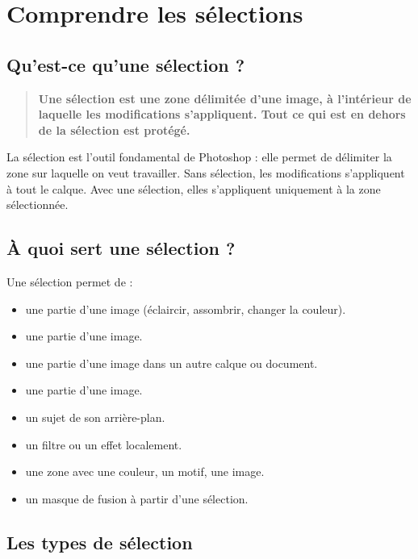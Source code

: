 \section{Comprendre les sélections}

\subsection{Qu'est-ce qu'une sélection ?}

\begin{quote}
\textbf{Une sélection est une zone délimitée d'une image, à l'intérieur de laquelle les modifications s'appliquent. Tout ce qui est en dehors de la sélection est protégé.}
\end{quote}

La sélection est l'outil fondamental de Photoshop : elle permet de délimiter la zone sur laquelle on veut travailler. Sans sélection, les modifications s'appliquent à tout le calque. Avec une sélection, elles s'appliquent uniquement à la zone sélectionnée.

\subsection{À quoi sert une sélection ?}

Une sélection permet de :

\begin{itemize}
    \item {} une partie d'une image (éclaircir, assombrir, changer la couleur).
    \item {} une partie d'une image.
    \item {} une partie d'une image dans un autre calque ou document.
    \item {} une partie d'une image.
    \item {} un sujet de son arrière-plan.
    \item {} un filtre ou un effet localement.
    \item {} une zone avec une couleur, un motif, une image.
    \item {} un masque de fusion à partir d'une sélection.
\end{itemize}

\subsection{Les types de sélection}

